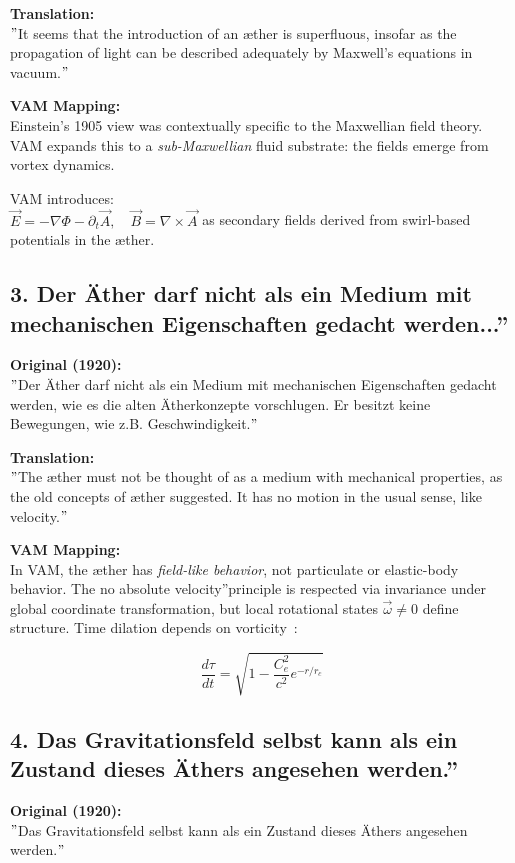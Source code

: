     \textbf{Translation:} \\
    \("\)It seems that the introduction of an æther is superfluous, insofar as the propagation of light can be described adequately by Maxwell's equations in vacuum.\("\)

    \textbf{VAM Mapping:} \\
    Einstein's 1905 view was contextually specific to the Maxwellian field theory. VAM expands this to a \emph{sub-Maxwellian} fluid substrate: the fields emerge from vortex dynamics.

    VAM introduces: \\
    \( \vec{E} = -\nabla \Phi - \partial_t \vec{A}, \quad \vec{B} = \nabla \times \vec{A} \) as secondary fields derived from swirl-based potentials in the æther.

    \subsection*{3. \grqq Der Äther darf nicht als ein Medium mit mechanischen Eigenschaften gedacht werden...\textquotedblright}
    \textbf{Original (1920):} \\
    \("\)Der Äther darf nicht als ein Medium mit mechanischen Eigenschaften gedacht werden, wie es die alten Ätherkonzepte vorschlugen. Er besitzt keine Bewegungen, wie z.B. Geschwindigkeit.\("\)

    \textbf{Translation:} \\
    \("\)The æther must not be thought of as a medium with mechanical properties, as the old concepts of æther suggested. It has no motion in the usual sense, like velocity.\("\)

    \textbf{VAM Mapping:} \\
    In VAM, the æther has \emph{field-like behavior}, not particulate or elastic-body behavior. The \grqq no absolute velocity\textquotedblright principle is respected via invariance under global coordinate transformation, but local rotational states \( \vec{\omega} \neq 0 \) define structure. Time dilation depends on vorticity~\cite{iskandarani2024vam2}:

    \[
    \frac{d\tau}{dt} = \sqrt{1 - \frac{C_e^2}{c^2} e^{-r/r_c}}
    \]

    \subsection*{4. \grqq Das Gravitationsfeld selbst kann als ein Zustand dieses Äthers angesehen werden.\textquotedblright}
    \textbf{Original (1920):} \\
    \("\)Das Gravitationsfeld selbst kann als ein Zustand dieses Äthers angesehen werden.\("\)

